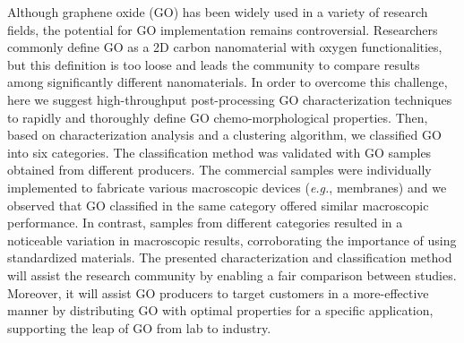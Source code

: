 \justifying
Although graphene oxide (GO) has been widely used in a variety of research fields, the potential for GO implementation remains controversial. Researchers commonly define GO as a 2D carbon nanomaterial with oxygen functionalities, but this definition is too loose and leads the community to compare results among significantly different nanomaterials. In order to overcome this challenge, here we suggest high-throughput post-processing GO characterization techniques to rapidly and thoroughly define GO chemo-morphological properties. Then, based on characterization analysis and a clustering algorithm, we classified GO into six categories. The classification method was validated with GO samples obtained from different producers. The commercial samples were individually implemented to fabricate various macroscopic devices (\textit{e.g.}, membranes) and we observed that GO classified in the same category offered similar macroscopic performance. In contrast, samples from different categories resulted in a noticeable variation in macroscopic results, corroborating the importance of using standardized materials. The presented characterization and classification method will assist the research community by enabling a fair comparison between studies. Moreover, it will assist GO producers to target customers in a more-effective manner by distributing GO with optimal properties for a specific application, supporting the leap of GO from lab to industry.